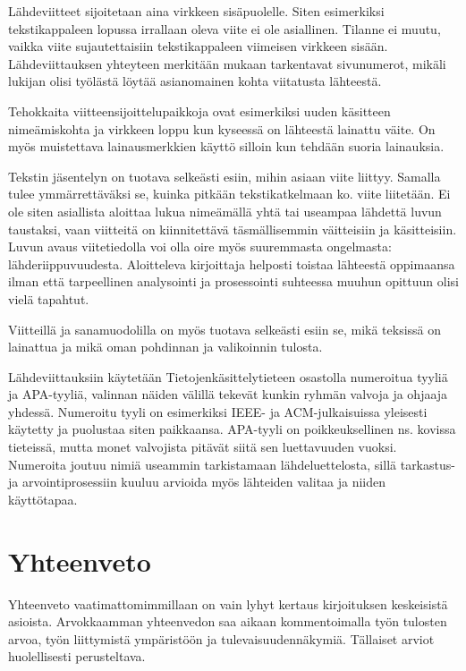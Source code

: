 Lähdeviitteet sijoitetaan aina virkkeen sisäpuolelle. Siten esimerkiksi
tekstikappaleen lopussa irrallaan oleva viite ei ole asiallinen. Tilanne
ei muutu, vaikka viite sujautettaisiin tekstikappaleen viimeisen
virkkeen sisään. 
Lähdeviittauksen yhteyteen merkitään mukaan tarkentavat
sivunumerot, mikäli lukijan olisi työlästä löytää asianomainen kohta
viitatusta lähteestä. 


Tehokkaita viitteensijoittelupaikkoja ovat esimerkiksi uuden käsitteen
nimeämiskohta ja virkkeen loppu kun kyseessä on lähteestä lainattu
väite. On myös muistettava lainausmerkkien käyttö silloin kun tehdään
suoria lainauksia.

Tekstin jäsentelyn on tuotava selkeästi esiin, mihin asiaan viite
liittyy. Samalla tulee ymmärrettäväksi se, kuinka pitkään
tekstikatkelmaan ko. viite liitetään. Ei ole siten asiallista aloittaa
lukua nimeämällä yhtä tai useampaa lähdettä luvun taustaksi, vaan
viitteitä on kiinnitettävä täsmällisemmin väitteisiin ja käsitteisiin.
Luvun avaus viitetiedolla voi olla oire myös suuremmasta ongelmasta:
lähderiippuvuudesta. Aloitteleva kirjoittaja helposti toistaa lähteestä
oppimaansa ilman että tarpeellinen analysointi ja prosessointi suhteessa
muuhun opittuun olisi vielä tapahtut.

Viitteillä ja sanamuodolilla on
myös tuotava selkeästi esiin se, mikä teksissä on lainattua ja mikä oman
pohdinnan ja valikoinnin tulosta.


Lähdeviittauksiin käytetään Tietojenkäsittelytieteen osastolla
numeroitua tyyliä ja APA-tyyliä, valinnan näiden välillä tekevät kunkin
ryhmän valvoja ja ohjaaja yhdessä. 
Numeroitu tyyli on esimerkiksi IEEE- ja
ACM-julkaisuissa yleisesti käytetty ja puolustaa siten paikkaansa.
APA-tyyli on poikkeuksellinen ns. kovissa tieteissä, mutta monet
valvojista pitävät siitä sen luettavuuden vuoksi. Numeroita joutuu nimiä
useammin tarkistamaan lähdeluettelosta, sillä tarkastus- ja
arvointiprosessiin kuuluu arvioida myös lähteiden valitaa ja niiden
käyttötapaa.





\section{Yhteenveto}

Yhteenveto  vaatimattomimmillaan on vain lyhyt kertaus kirjoituksen
keskeisistä asioista. Arvokkaamman yhteenvedon saa aikaan kommentoimalla
 työn tulosten arvoa, työn liittymistä ympäristöön ja
tulevaisuudennäkymiä. Tällaiset arviot  huolellisesti
perusteltava.

